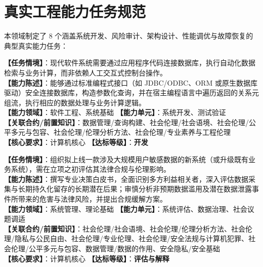 \section{真实工程能力任务规范}

本领域制定了 8 个涵盖系统开发、风险审计、架构设计、性能调优与故障恢复的典型真实能力任务：

\begin{taskbox}[任务 1：为业务目标实现数据库编程式访问与数据处理]
\textbf{【任务情境】}：现代软件系统需要通过应用程序代码连接数据库，执行自动化数据检索与业务计算，而非依赖人工交互式控制台操作。\\
\textbf{【能力陈述】}：能够通过标准编程式接口（如 JDBC/ODBC、ORM 或原生数据库驱动）安全连接数据库，构造参数化查询，并在宿主编程语言中遍历返回的关系元组流，执行相应的数据处理与业务计算逻辑。\\
\textbf{【能力领域】}：软件工程、系统基础 \quad \textbf{【能力单元】}：系统开发、测试验证\\
\textbf{【关联合约/前置知识】}：数据管理/查询构建、社会伦理/社会语境、社会伦理/公平多元与包容、社会伦理/伦理分析方法、社会伦理/专业素养与工程伦理\\
\textbf{【核心要求】}：计算机核心 \quad \textbf{【达标等级】}：\textbf{开发}
\end{taskbox}

\begin{taskbox}
\textbf{【任务情境】}：组织拟上线一款涉及大规模用户敏感数据的新系统（或升级既有业务系统），需在立项之初评估其法律合规与伦理影响。\\
\textbf{【能力陈述】}：撰写专业决策白皮书，全面识别多方利益相关者，深入评估数据采集与长期持久化留存的长期潜在后果；审慎分析非预期数据滥用及潜在数据泄露事件所带来的危害与法律风险，并提出合规缓解方案。\\
\textbf{【能力领域】}：系统管理、理论基础 \quad \textbf{【能力单元】}：系统评估、数据治理、社会议题调适\\
\textbf{【关联合约/前置知识】}：社会伦理/社会语境、社会伦理/伦理分析方法、社会伦理/隐私与公民自由、社会伦理/专业伦理、社会伦理/安全法规与计算机犯罪、社会伦理/公平多元与包容、数据管理/数据的作用、安全隐私/安全基础\\
\textbf{【核心要求】}：计算机核心 \quad \textbf{【达标等级】}：\textbf{评估与解释}
\end{taskbox}

